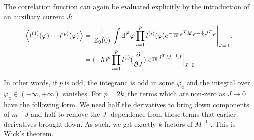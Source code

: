 The correlation function can again be evaluated explicitly by the introduction of an auxiliary current $J$:
\begin{align}
  \expectationvalue{l^{(1)}(\varphi) \cdots l^{(p)} (\varphi)} &= \frac{1}{Z_0(0)} \left.\int \dd[N]{\varphi} \prod_{i = 1}^p l^{(i)}(\varphi) e^{-\frac{1}{2\hbar} \varphi^T M \varphi - \frac{1}{\hbar} J^T \varphi} \right\rvert_{J = 0}. \\
							       &= (-\hbar)^p \prod_{i = 1}^p l^{(i)}(\frac{\partial }{\partial J}) \left. e^{\frac{1}{2\hbar} J^T M^{-1} J} \right\rvert_{J=0}
\end{align}

In other words, if $p$  is odd, the integrand is odd in some $\varphi_a$  and the integral over $\varphi_a \in (- \infty, + \infty )$   vanishes.
For $p = 2 k$, the terms which are non-zero as $J \to 0$ have the following form.
We need half the derivatives to bring down components of  $m^{-1} J$  and half to remove the $J$ -dependence from those terms that earlier derivatives brought down.
As such, we get exactly $k$  factors of $M^{-1}$ .
This is Wick's theorem.

